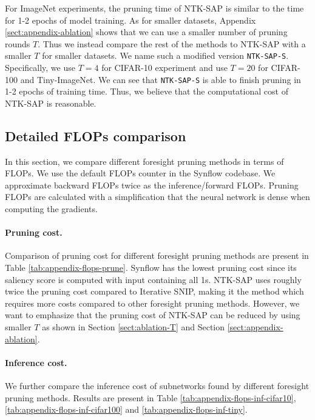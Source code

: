 \documentclass{article} %
\begin{document}
For ImageNet experiments, the pruning time of NTK-SAP is similar to the time for 1-2 epochs of model training. As for smaller datasets, Appendix \ref{sect:appendix-ablation} shows that we can use a smaller number of pruning rounds $T$. Thus we instead compare the rest of the methods to NTK-SAP with a smaller $T$ for smaller datasets. We name such a modified version \texttt{NTK-SAP-S}. Specifically, we use $T=4$ for CIFAR-10 experiment and use $T=20$ for CIFAR-100 and Tiny-ImageNet. We can see that \texttt{NTK-SAP-S} is able to finish pruning in 1-2 epochs of training time. Thus, we believe that the computational cost of NTK-SAP is reasonable.

\subsection{Detailed FLOPs comparison} \label{sect:appendix-flops}



In this section, we compare different foresight pruning methods in terms of FLOPs. We use the default FLOPs counter in the Synflow codebase. We approximate backward FLOPs twice as the inference/forward FLOPs. Pruning FLOPs are calculated with a simplification that the neural network is dense when computing the gradients.

\paragraph{Pruning cost.} Comparison of pruning cost for different foresight pruning methods are present in Table \ref{tab:appendix-flops-prune}. Synflow has the lowest pruning cost since its saliency score is computed with input containing all 1s. NTK-SAP uses roughly twice the pruning cost compared to Iterative SNIP, making it the method which requires more costs compared to other foresight pruning methods. However, we want to emphasize that the pruning cost of NTK-SAP can be reduced by using smaller $T$ as shown in Section \ref{sect:ablation-T} and Section \ref{sect:appendix-ablation}. 

\paragraph{Inference cost.} We further compare the inference cost of subnetworks found by different foresight pruning methods. Results are present in Table \ref{tab:appendix-flops-inf-cifar10}, \ref{tab:appendix-flops-inf-cifar100} and \ref{tab:appendix-flops-inf-tiny}.
\end{document}
